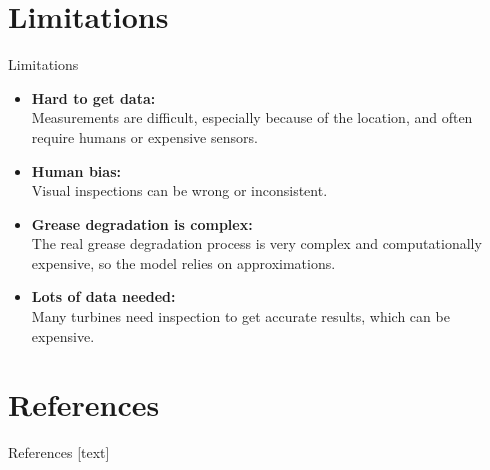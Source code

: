 \documentclass[aspectratio=169,xcolor=dvipsnames]{beamer}
\begin{document}
\section{Limitations}
\begin{frame}{Limitations}
    \begin{itemize}
        \item \textbf{Hard to get data:} \\
        Measurements are difficult, especially because of the location, and often require humans or expensive sensors.
        \item \textbf{Human bias:} \\
        Visual inspections can be wrong or inconsistent.
        \item \textbf{Grease degradation is complex:} \\ 
        The real grease degradation process is very complex and computationally expensive, so the model relies on approximations.
        \item \textbf{Lots of data needed:} \\
        Many turbines need inspection to get accurate results, which can be expensive.
    \end{itemize}
\end{frame}

\section{References}
\begin{frame}{References}
    \nocite{*}
    [text]
    
    
\end{frame}
\end{document}

